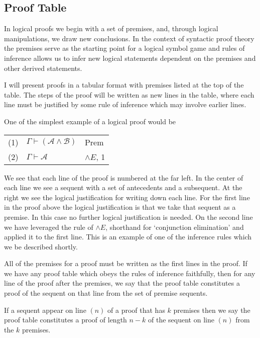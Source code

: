 \documentclass[12pt]{article}
\newcommand{\mc}[1]{\mathcal{#1}}
\begin{document}
\subsection{Proof Table}

In logical proofs we begin with a set of premises, and, through logical manipulations, we draw new conclusions.
In the context of syntactic proof theory the premises serve as the starting point for a logical symbol game and rules of inference allows us to infer new logical statements dependent on the premises and other derived statements.

I will present proofs in a tabular format with premises listed at the top of the table.
The steps of the proof will be written as new lines in the table, where each line must be justified by some rule of inference which may involve earlier lines. 

One of the simplest example of a logical proof would be

\begin{center}
\begin{tabular}{ p{1cm} p{6cm} p{2cm} }
(1) & $\Gamma \vdash (\mc{A} \land \mc{B})$ & Prem\\
(2) & $\Gamma \vdash \mc{A}$ & $\land E$, 1\\
\end{tabular}
\end{center}

We see that each line of the proof is numbered at the far left.
In the center of each line we see a sequent with a set of antecedents and a subsequent.
At the right we see the logical justification for writing down each line.
For the first line in the proof above the logical justification is that we take that sequent as a premise.
In this case no further logical justification is needed.
On the second line we have leveraged the rule of $\land E$, shorthand for `conjunction elimination' and applied it to the first line.
This is an example of one of the inference rules which we be described shortly.

All of the premises for a proof must be written as the first lines in the proof.
If we have any proof table which obeys the rules of inference faithfully, then for any line of the proof after the premises, we say that the proof table constitutes a proof of the sequent on that line from the set of premise sequents.

If a sequent appear on line $(n)$ of a proof that has $k$ premises then we say the proof table constitutes a proof of length $n-k$ of the sequent on line $(n)$ from the $k$ premises.
\end{document}
